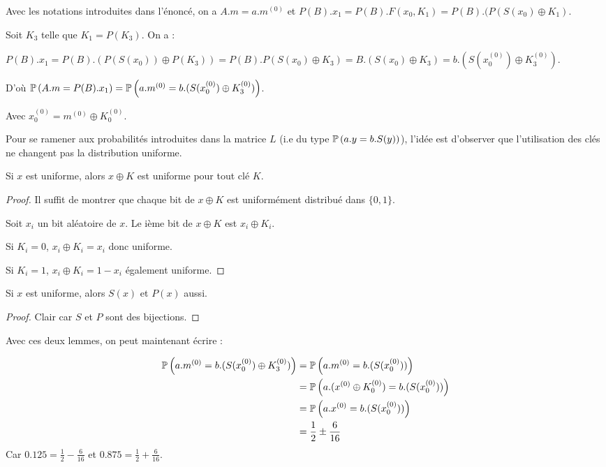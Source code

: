 Avec les notations introduites dans l'énoncé, on a $A.m = a.m^{(0)}$ et $P(B).x_1 = P(B).F(x_0,K_1) = P(B).(P(S(x_0)\oplus K_1)$.

Soit $K_3$ telle que $K_1 = P(K_3)$. On a :

$P(B).x_1 = P(B).(P(S(x_0))\oplus P(K_3)) = P(B).P(S(x_0) \oplus K_3) = B.(S(x_0) \oplus K_3) = b.(S(x_0^{(0)}) \oplus K_3^{(0)})$.

D'où $\mathbb{P}\left( A.m = P(B).x_1 \right) = \mathbb{P}\left( a.m^{(0)}= b.(S(x_0^{(0)}) \oplus K_3^{(0)}) \right)$.

Avec $x_0^{(0)} = m^{(0)} \oplus K_0^{(0)}$.

Pour se ramener aux probabilités introduites dans la matrice $L$ (i.e du type $\mathbb{P}\left( a.y = b.S(y) \right)$), l'idée est d'observer que l'utilisation des clés ne changent pas la distribution uniforme.

\begin{lemma}
	Si $x$ est uniforme, alors $x \oplus K$ est uniforme pour tout clé $K$.
\end{lemma}

\begin{proof}
	Il suffit de montrer que chaque bit de $x \oplus K$ est uniformément distribué dans $\{0,1\}$.

	Soit $x_i$ un bit aléatoire de $x$. Le ième bit de $x \oplus K$ est $x_i \oplus K_i$.

	Si $K_i = 0$, $x_i \oplus K_i = x_i$ donc uniforme.

	Si $K_i = 1$, $x_i \oplus K_i = 1 - x_i$ également uniforme. 
\end{proof}

\begin{lemma}
	Si $x$ est uniforme, alors $S(x)$ et $P(x)$ aussi.
\end{lemma}
\begin{proof}
	Clair car $S$ et $P$ sont des bijections.
\end{proof}

Avec ces deux lemmes, on peut maintenant écrire :

\begin{align*}
\mathbb{P}\left( a.m^{(0)}= b.(S(x_0^{(0)}) \oplus K_3^{(0)}) \right) &= \mathbb{P}\left( a.m^{(0)} = b.(S(x_0^{(0)})) \right) \\
													&= \mathbb{P}\left( a.(x^{(0)} \oplus K_0^{(0)}) =  b.(S(x_0^{(0)})) \right) \\
													&= \mathbb{P}\left( a.x^{(0)} = b.(S(x_0^{(0)})) \right) \\
													&= \frac{1}{2} \pm \frac{6}{16}
\end{align*}
Car $0.125 = \frac{1}{2} - \frac{6}{16}$ et $0.875 = \frac{1}{2} + \frac{6}{16}$.

